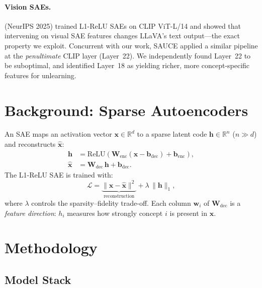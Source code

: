 \documentclass{article}
\begin{document}
\paragraph{Vision SAEs.}
\citet{pach2025saevlm} (NeurIPS 2025) trained L1-ReLU SAEs on CLIP
ViT-L/14 and showed that intervening on visual SAE features changes
LLaVA's text output---the exact property we exploit.
Concurrent with our work, SAUCE applied a similar pipeline at the
\emph{penultimate} CLIP layer (Layer~22). We independently found
Layer~22 to be suboptimal, and identified Layer~18 as yielding
richer, more concept-specific features for unlearning.

\section{Background: Sparse Autoencoders}
\label{sec:background}

An SAE maps an activation vector $\mathbf{x}\!\in\!\mathbb{R}^{d}$ to a
sparse latent code $\mathbf{h}\!\in\!\mathbb{R}^{n}$ ($n\!\gg\!d$) and
reconstructs $\hat{\mathbf{x}}$:
\begin{align}
  \mathbf{h} &= \mathrm{ReLU}\!\left(
    \mathbf{W}_{\mathrm{enc}}(\mathbf{x} - \mathbf{b}_{\mathrm{dec}})
    + \mathbf{b}_{\mathrm{enc}}\right), \label{eq:enc}\\
  \hat{\mathbf{x}} &= \mathbf{W}_{\mathrm{dec}}\,\mathbf{h}
                     + \mathbf{b}_{\mathrm{dec}}. \label{eq:dec}
\end{align}
The L1-ReLU SAE is trained with:
\begin{equation}
  \mathcal{L} = \underbrace{\|\mathbf{x} - \hat{\mathbf{x}}\|^2}_{
    \text{reconstruction}}
    + \lambda\,\|\mathbf{h}\|_1,
  \label{eq:loss}
\end{equation}
where $\lambda$ controls the sparsity--fidelity trade-off. Each column
$\mathbf{w}_i$ of $\mathbf{W}_{\mathrm{dec}}$ is a \emph{feature
direction}: $h_i$ measures how strongly concept $i$ is present in
$\mathbf{x}$.

\section{Methodology}
\label{sec:method}

\subsection{Model Stack}
\end{document}
